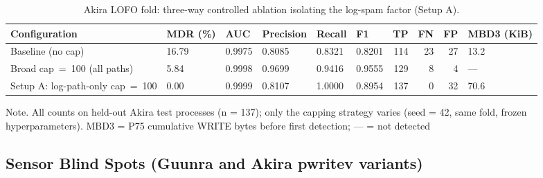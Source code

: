 \begin{table}[htbp]
\centering
\small
\caption{Akira LOFO fold: three-way controlled ablation isolating the log-spam factor (Setup A).}\label{tab:4-6}
\begin{tabularx}{\textwidth}{Xlllllrrrl}
\hline
\textbf{Configuration} & \textbf{MDR (\%)} & \textbf{AUC} & \textbf{Precision} & \textbf{Recall} & \textbf{F1} & \textbf{TP} & \textbf{FN} & \textbf{FP} & \textbf{MBD3 (KiB)} \\
\hline
Baseline (no cap) & 16.79 & 0.9975 & 0.8085 & 0.8321 & 0.8201 & 114 & 23 & 27 & 13.2 \\
Broad cap~=~100 (all paths) & 5.84 & 0.9998 & 0.9699 & 0.9416 & 0.9555 & 129 & 8 & 4 & --- \\
Setup A: log-path-only cap~=~100 & 0.00 & 0.9999 & 0.8107 & 1.0000 & 0.8954 & 137 & 0 & 32 & 70.6 \\
\hline
\end{tabularx}
\end{table}

Note. All counts on held-out Akira test processes (n = 137); only the capping strategy varies (seed = 42, same fold, frozen hyperparameters). MBD3 = P75 cumulative WRITE bytes before first detection; --- = not detected

\subsection{Sensor Blind Spots (Guunra and Akira pwritev variants)}\label{sec:4.5.2}

